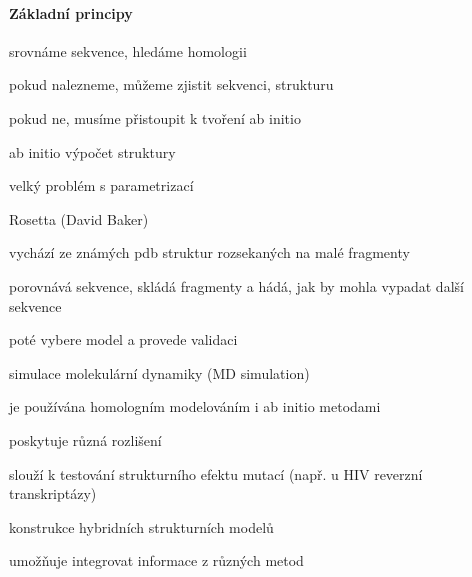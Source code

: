 \documentclass[DIV=8]{scrreprt}
\begin{document}
\paragraph{Základní principy}
\begin{myItemize}[nosep]
    \item srovnáme sekvence, hledáme homologii
\begin{myItemize}[nosep]
    \item pokud nalezneme, můžeme zjistit sekvenci, strukturu
    \item pokud ne, musíme přistoupit k tvoření ab initio
\end{myItemize}

    \item ab initio výpočet struktury
\begin{myItemize}[nosep]
    \item velký problém s parametrizací
    \item Rosetta (David Baker)
\begin{myItemize}[nosep]
    \item vychází ze známých pdb struktur rozsekaných na malé fragmenty
    \item porovnává sekvence, skládá fragmenty a hádá, jak by mohla vypadat další sekvence
    \item poté vybere model a provede validaci
\end{myItemize}

\end{myItemize}

    \item simulace molekulární dynamiky (MD simulation)
\begin{myItemize}[nosep]
    \item je používána homologním modelováním i ab initio metodami
    \item poskytuje různá rozlišení
    \item slouží k testování strukturního efektu mutací (např. u HIV reverzní transkriptázy)
\end{myItemize}

    \item konstrukce hybridních strukturních modelů
\begin{myItemize}[nosep]
    \item umožňuje integrovat informace z různých metod
\end{myItemize}

\end{myItemize}
\end{document}
